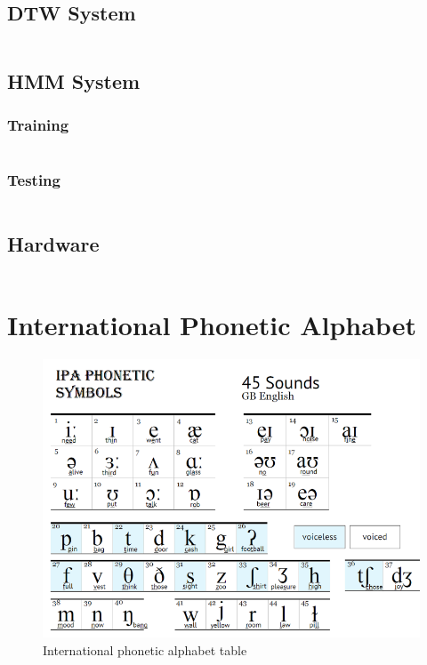 \documentclass[12pt, a4paper, twoside]{report}
\begin{document}
\begin{appendices}
\section{DTW System}
\inputminted[linenos, numbersep=5pt, frame=single, breaklines=true, tabsize=2]
{Matlab}{codes/dtw.m}

\section{HMM System}
\subsection{Training}
\inputminted[linenos, numbersep=5pt, frame=single, breaklines=true, tabsize=2]
{Python}{codes/hmm-train.py}
\subsection{Testing}
\inputminted[linenos, numbersep=5pt, frame=single, breaklines=true, tabsize=2]
{Python}{codes/hmm-test.py}

\section{Hardware}
\inputminted[linenos, numbersep=5pt, frame=single, breaklines=true, tabsize=2]
{C}{codes/hardware.c}

\chapter{International Phonetic Alphabet}
\begin{figure}[!h]
	\centering
	\includegraphics[width=1\textwidth]
	{images/appendix-b/ipa}
	\caption{International phonetic alphabet table}
	\label{fig:hardware-6}
\end{figure}

\end{appendices}
\end{document}
